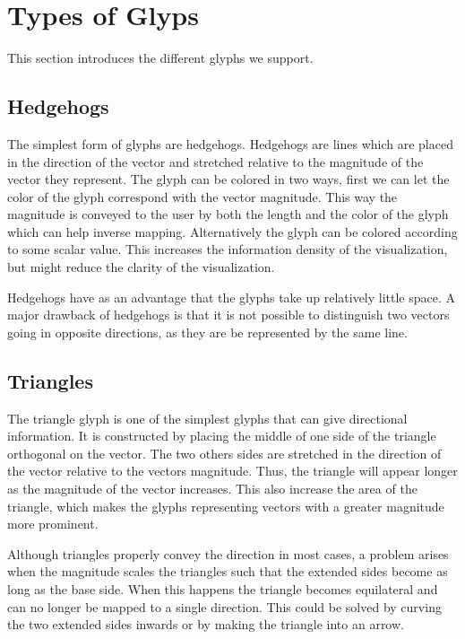 


\section{Types of Glyps} %
\label{sec:types_of_glyps}
This section introduces the different glyphs we support. 

\subsection{Hedgehogs} %
\label{sub:hedgehogs}
The simplest form of glyphs are hedgehogs. Hedgehogs are lines which are placed in the direction of the vector and stretched relative to the magnitude of the vector they represent. The glyph can be colored in two ways, first we can let the color of the glyph correspond with the vector magnitude. This way the magnitude is conveyed to the user by both the length and the color of the glyph which can help inverse mapping. Alternatively the glyph can be colored according to some scalar value. This increases the information density of the visualization, but might reduce the clarity of the visualization.

Hedgehogs have as an advantage that the glyphs take up relatively little space. A major drawback of hedgehogs is that it is not possible to distinguish two vectors going in opposite directions, as they are be represented by the same line. 

\subsection{Triangles} %
\label{sub:triangles}
The triangle glyph is one of the simplest glyphs that can give directional information. It is constructed by placing the middle of one side of the triangle orthogonal on the vector. The two others sides are stretched in the direction of the vector relative to the vectors magnitude. Thus, the triangle will appear longer as the magnitude of the vector increases. This also increase the area of the triangle, which makes the glyphs representing vectors with a greater magnitude more prominent.

Although triangles properly convey the direction in most cases, a problem arises when the magnitude scales the triangles such that the extended sides become as long as the base side.  When this happens the triangle becomes equilateral and can no longer be mapped to a single direction. This could be solved by curving the two extended sides inwards or by making the triangle into an arrow.

